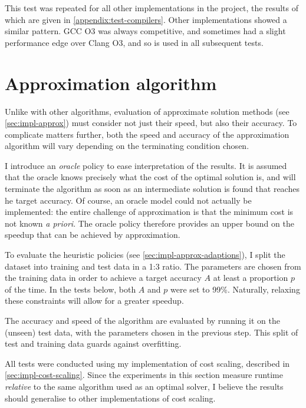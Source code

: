 This test was repeated for all other implementations in the project, the results of which are given in \cref{appendix:test-compilers}. Other implementations showed a similar pattern\footnotemark. GCC O3 was always competitive, and sometimes had a slight performance edge over Clang O3, and so is used in all subsequent tests.

\section{Approximation algorithm} \label{sec:eval-approx}

Unlike with other algorithms, evaluation of approximate solution methods (see \cref{sec:impl-approx}) must consider not just their speed, but also their accuracy. To complicate matters further, both the speed and accuracy of the approximation algorithm will vary depending on the terminating condition chosen.

I introduce an \emph{oracle} policy to ease interpretation of the results. It is assumed that the oracle knows precisely what the cost of the optimal solution is, and will terminate the algorithm as soon as an intermediate solution is found that reaches he target accuracy. Of course, an oracle model could not actually be implemented: the entire challenge of approximation is that the minimum cost is not known \textit{a priori}. The oracle policy therefore provides an upper bound on the speedup that can be achieved by approximation.

To evaluate the heuristic policies (see \cref{sec:impl-approx-adaptions}), I split the dataset into training and test data in a 1:3 ratio. The parameters are chosen from the training data in order to achieve a target accuracy $A$ at least a proportion $p$ of the time. In the tests below, both $A$ and $p$ were set to 99\%. Naturally, relaxing these constraints will allow for a greater speedup.

The accuracy and speed of the algorithm are evaluated by running it on the (unseen) test data, with the parameters chosen in the previous step. This split of test and training data guards against overfitting.

All tests were conducted using my implementation of cost scaling, described in \cref{sec:impl-cost-scaling}. Since the experiments in this section measure runtime \emph{relative} to the same algorithm used as an optimal solver, I believe the results should generalise to other implementations of cost scaling. 

